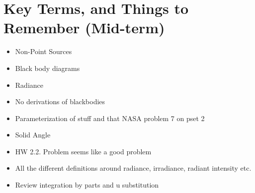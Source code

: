 \documentclass{article}
\begin{document}
\clearpage
\section{Key Terms, and Things to Remember (Mid-term)} 
\begin{itemize}
\item Non-Point Sources
\item Black body diagrams
\item Radiance
\item No derivations of blackbodies
\item Parameterization of stuff and that NASA problem 7 on pset 2
\item Solid Angle 
\item HW 2.2. Problem seems like a good problem
\item All the different definitions around radiance, irradiance, radiant intensity etc.
\item Review integration by parts and u substitution 



 
\end{itemize}

\clearpage












\end{document}
